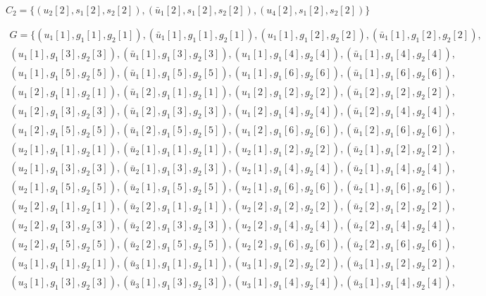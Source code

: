 \documentclass{article}
\begin{document}
\begin{equation*}
  C_2 =  \{  ( u_2[2],  s_1[2], s_2[2]   ),  ( \bar{u}_1[2],  s_1[2], s_2[2]  ),  ( u_4[2],  s_1[2], s_2[2]   )  \}
\end{equation*}

\begin{equation*}
\begin{split}
  G =  \{ ( u_1[1], g_1[1], g_2[1] ), (\bar{u}_1[1], g_1[1], g_2[1] ), ( u_1[1], g_1[2], g_2[2] ), ( \bar{u}_1[1], g_1[2], g_2[2] ),\\
  ( u_1[1], g_1[3], g_2[3] ), (\bar{u}_1[1], g_1[3], g_2[3] ), ( u_1[1], g_1[4], g_2[4] ), ( \bar{u}_1[1], g_1[4], g_2[4] ),\\
  ( u_1[1], g_1[5], g_2[5] ), (\bar{u}_1[1], g_1[5], g_2[5] ), ( u_1[1], g_1[6], g_2[6] ), ( \bar{u}_1[1], g_1[6], g_2[6] ),\\
  ( u_1[2], g_1[1], g_2[1] ), (\bar{u}_1[2], g_1[1], g_2[1] ), ( u_1[2], g_1[2], g_2[2] ), ( \bar{u}_1[2], g_1[2], g_2[2] ),\\
  ( u_1[2], g_1[3], g_2[3] ), (\bar{u}_1[2], g_1[3], g_2[3] ), ( u_1[2], g_1[4], g_2[4] ), ( \bar{u}_1[2], g_1[4], g_2[4] ),\\
  ( u_1[2], g_1[5], g_2[5] ), (\bar{u}_1[2], g_1[5], g_2[5] ), ( u_1[2], g_1[6], g_2[6] ), ( \bar{u}_1[2], g_1[6], g_2[6] ),\\
  ( u_2[1], g_1[1], g_2[1] ), (\bar{u}_2[1], g_1[1], g_2[1] ), ( u_2[1], g_1[2], g_2[2] ), ( \bar{u}_2[1], g_1[2], g_2[2] ),\\
  ( u_2[1], g_1[3], g_2[3] ), (\bar{u}_2[1], g_1[3], g_2[3] ), ( u_2[1], g_1[4], g_2[4] ), ( \bar{u}_2[1], g_1[4], g_2[4] ),\\
  ( u_2[1], g_1[5], g_2[5] ), (\bar{u}_2[1], g_1[5], g_2[5] ), ( u_2[1], g_1[6], g_2[6] ), ( \bar{u}_2[1], g_1[6], g_2[6] ),\\
  ( u_2[2], g_1[1], g_2[1] ), (\bar{u}_2[2], g_1[1], g_2[1] ), ( u_2[2], g_1[2], g_2[2] ), ( \bar{u}_2[2], g_1[2], g_2[2] ),\\
  ( u_2[2], g_1[3], g_2[3] ), (\bar{u}_2[2], g_1[3], g_2[3] ), ( u_2[2], g_1[4], g_2[4] ), ( \bar{u}_2[2], g_1[4], g_2[4] ),\\
  ( u_2[2], g_1[5], g_2[5] ), (\bar{u}_2[2], g_1[5], g_2[5] ), ( u_2[2], g_1[6], g_2[6] ), ( \bar{u}_2[2], g_1[6], g_2[6] ),\\
  ( u_3[1], g_1[1], g_2[1] ), (\bar{u}_3[1], g_1[1], g_2[1] ), ( u_3[1], g_1[2], g_2[2] ), ( \bar{u}_3[1], g_1[2], g_2[2] ),\\
  ( u_3[1], g_1[3], g_2[3] ), (\bar{u}_3[1], g_1[3], g_2[3] ), ( u_3[1], g_1[4], g_2[4] ), ( \bar{u}_3[1], g_1[4], g_2[4] ),\\

\end{split}
\end{equation*}
\end{document}
